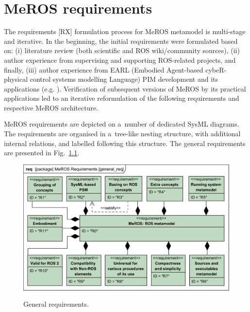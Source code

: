 \documentclass[11pt,oneside,a4paper]{report}
\begin{document}
	
\chapter{MeROS requirements}
\label{ch:requirements}
	The requirements [RX] formulation process for MeROS metamodel is multi-stage and iterative. In the beginning, the initial requirements were formulated based on: (i) literature review (both scientific and ROS wiki/community sources), (ii) author experience from supervising and supporting ROS-related projects, and finally, (iii) author experience from EARL (Embodied Agent-based cybeR-physical control systems modelling Language) \cite{earl2020} PIM development and its applications (e.g. \cite{tasker2020,karwowski2021hubero,en14206693-grav-comp}). Verification of subsequent versions of MeROS by its practical applications led to an iterative reformulation of the following requirements and respective MeROS architecture.
	
	MeROS requirements are depicted on a~number of dedicated SysML diagrams. The requirements are organised in a~tree-like nesting structure, with additional internal relations, and labelled following this structure. The general requirements are presented in Fig.~\ref{fig:general_req}. 
		
	\begin{figure}[H]
		\centering
		\begin{center}
			{\includegraphics[scale=1.0]{diagrams/general_req.png}}
		\end{center}
		\caption{General requirements.}
		\label{fig:general_req}
	\end{figure}
		
\end{document}
